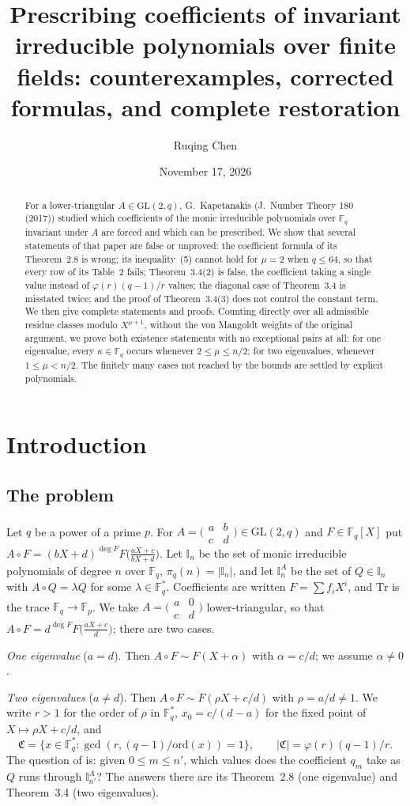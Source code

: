 \documentclass[11pt,a4paper]{amsart}
\title[Coefficients of invariant irreducible polynomials]{Prescribing coefficients of invariant irreducible
polynomials over finite fields: counterexamples, corrected formulas, and complete restoration}
\author{Ruqing Chen}
\date{November 17, 2026}
\theoremstyle{remark}
\newcommand{\F}{\mathbb{F}}
\newcommand{\Fq}{\mathbb{F}_q}
\newcommand{\Tr}{\mathrm{Tr}}
\newcommand{\I}{\mathbb{I}}
\newcommand{\fC}{\mathfrak{C}}
\newcommand{\ord}{\mathrm{ord}}
\newcommand{\mat}[4]{\bigl(\begin{smallmatrix}#1&#2\\#3&#4\end{smallmatrix}\bigr)}
\begin{document}
\begin{abstract}
For a lower-triangular $A\in\mathrm{GL}(2,q)$, G.~Kapetanakis (J.~Number Theory 180 (2017)) studied which
coefficients of the monic irreducible polynomials over $\Fq$ invariant under $A$ are forced and which can be
prescribed. We show that several statements of that paper are false or unproved: the coefficient formula of its
Theorem~2.8 is wrong; its inequality~(5) cannot hold for $\mu=2$ when $q\le64$, so that every row of its
Table~2 fails; Theorem~3.4(2) is false, the coefficient taking a single value instead of $\varphi(r)(q-1)/r$
values; the diagonal case of Theorem~3.4 is misstated twice; and the proof of Theorem~3.4(3) does not control
the constant term. We then give complete statements and proofs. Counting directly over all admissible residue
classes modulo $X^{\mu+1}$, without the von Mangoldt weights of the original argument, we prove both existence
statements with no exceptional pairs at all: for one eigenvalue, every $\kappa\in\Fq$ occurs whenever
$2\le\mu\le n/2$; for two eigenvalues, whenever $1\le\mu<n/2$. The finitely many cases not reached by the bounds
are settled by explicit polynomials.
\end{abstract}
\maketitle

\section{Introduction}

\subsection{The problem}
Let $q$ be a power of a prime $p$. For $A=\mat abcd\in\mathrm{GL}(2,q)$ and $F\in\Fq[X]$ put
$A\circ F=(bX+d)^{\deg F}F\bigl(\tfrac{aX+c}{bX+d}\bigr)$. Let $\I_n$ be the set of monic irreducible polynomials
of degree $n$ over $\Fq$, $\pi_q(n)=|\I_n|$, and let $\I_n^A$ be the set of $Q\in\I_n$ with $A\circ Q=\lambda Q$
for some $\lambda\in\Fq^*$. Coefficients are written $F=\sum f_iX^i$, and $\Tr$ is the trace $\Fq\to\F_p$. We
take $A=\mat a0cd$ lower-triangular, so that $A\circ F=d^{\deg F}F\bigl(\tfrac{aX+c}{d}\bigr)$; there are two cases.

\emph{One eigenvalue} ($a=d$). Then $A\circ F\sim F(X+\alpha)$ with $\alpha=c/d$; we assume $\alpha\ne0$.

\emph{Two eigenvalues} ($a\ne d$). Then $A\circ F\sim F(\rho X+c/d)$ with $\rho=a/d\ne1$. We write $r>1$ for the
order of $\rho$ in $\Fq^*$, $x_0=c/(d-a)$ for the fixed point of $X\mapsto\rho X+c/d$, and
\[
\fC=\{x\in\Fq^*:\gcd(r,(q-1)/\ord(x))=1\},\qquad|\fC|=\varphi(r)(q-1)/r .
\]
The question of \cite{K} is: given $0\le m\le n'$, which values does the coefficient $q_m$ take as $Q$ runs
through $\I^A_{n'}$? The answers there are its Theorem~2.8 (one eigenvalue) and Theorem~3.4 (two eigenvalues).
\end{document}
